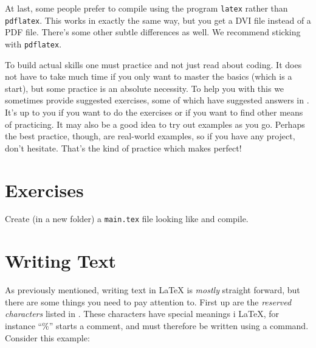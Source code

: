At last, some people prefer to compile using the program \verb|latex| rather than \verb|pdflatex|. This works in exactly the same way, but you get a DVI file instead of a PDF file. There's some other subtle differences as well. We recommend sticking with \verb|pdflatex|.

To build actual skills one must practice and not just read about coding. It does not have to take much time if you only want to master the basics (which is a start), but some practice is an absolute necessity. To help you with this we sometimes provide suggested exercises, some of which have suggested answers in . It's up to you if you want to do the exercises or if you want to find other means of practicing. It may also be a good idea to try out examples as you go. Perhaps the best practice, though, are real-world examples, so if you have any project, don't hesitate. That's the kind of practice which makes perfect!

\section{Exercises}
\begin{ExerciseList}
	\Exercise Create (in a new folder) a \verb|main.tex| file looking like  and compile.
\end{ExerciseList}

\section{Writing Text}\label{sec:latex:writing}
As previously mentioned, writing text in \LaTeX{} is \emph{mostly} straight forward, but there are some things you need to pay attention to. First up are the \emph{reserved characters} listed in . These characters have special meanings i \LaTeX{}, for instance ``\%'' starts a comment, and must therefore be written using a command. Consider this example:

